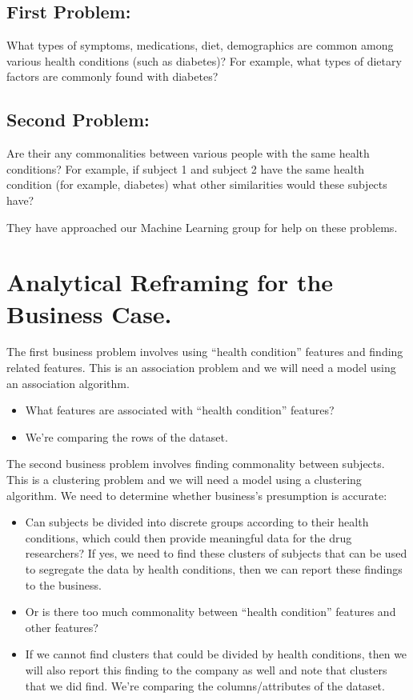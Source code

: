 \documentclass[]{article}
\begin{document}
\hypertarget{first-problem}{%
\subsection{First Problem:}\label{first-problem}}

What types of symptoms, medications, diet, demographics are common among
various health conditions (such as diabetes)? For example, what types of
dietary factors are commonly found with diabetes?

\hypertarget{second-problem}{%
\subsection{Second Problem:}\label{second-problem}}

Are their any commonalities between various people with the same health
conditions? For example, if subject 1 and subject 2 have the same health
condition (for example, diabetes) what other similarities would these
subjects have?

They have approached our Machine Learning group for help on these
problems.

\hypertarget{analytical-reframing-for-the-business-case.}{%
\section{Analytical Reframing for the Business
Case.}\label{analytical-reframing-for-the-business-case.}}

The first business problem involves using ``health condition'' features
and finding related features. This is an association problem and we will
need a model using an association algorithm.

\begin{itemize}
\item
  What features are associated with ``health condition'' features?
\item
  We're comparing the rows of the dataset.
\end{itemize}

The second business problem involves finding commonality between
subjects. This is a clustering problem and we will need a model using a
clustering algorithm. We need to determine whether business's
presumption is accurate:

\begin{itemize}
\item
  Can subjects be divided into discrete groups according to their health
  conditions, which could then provide meaningful data for the drug
  researchers? If yes, we need to find these clusters of subjects that
  can be used to segregate the data by health conditions, then we can
  report these findings to the business.
\item
  Or is there too much commonality between ``health condition'' features
  and other features?
\item
  If we cannot find clusters that could be divided by health conditions,
  then we will also report this finding to the company as well and note
  that clusters that we did find. We're comparing the columns/attributes
  of the dataset.
\end{itemize}
\end{document}
